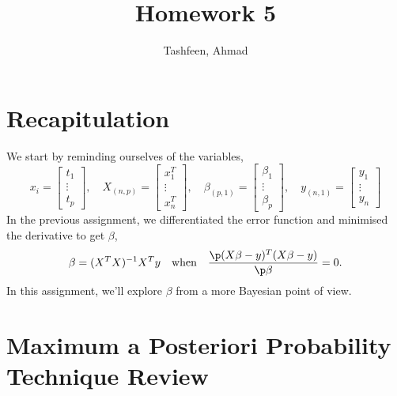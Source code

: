 \documentclass{homework}
\author{Tashfeen, Ahmad}
\title{Homework 5}
\begin{document}
 \maketitle

\section{Recapitulation}

We start by reminding ourselves of the variables,
\[
  x_i =
  \begin{bmatrix}%
    t_1 \\ \vdots \\ t_{p}
  \end{bmatrix},
  \quad
  X_{(n, p)} =
  \begin{bmatrix}
    x^T_1 \\ \vdots \\ x^T_n
  \end{bmatrix},
  \quad
  \beta_{(p, 1)} =
  \begin{bmatrix}
    \beta_1 \\ \vdots \\ \beta_p
  \end{bmatrix},
  \quad
  y_{(n, 1)} =
  \begin{bmatrix}
    y_1 \\ \vdots \\ y_n
  \end{bmatrix}
\]
In the previous assignment, we differentiated the error function and
minimised the derivative to get $\beta$,
\[
  \beta = (X^TX)^{-1}X^Ty
  \quad\text{when}\quad
  \frac{\p (X\beta - y)^T(X\beta - y)}{\p \beta} = 0.
\]
In this assignment, we'll explore $\beta$ from a more Bayesian point of view.

\section{Maximum a Posteriori Probability Technique Review}
\end{document}
